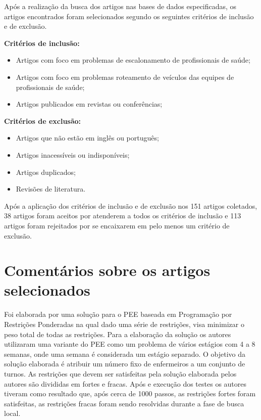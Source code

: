 Após a realização da busca dos artigos nas bases de dados especificadas, os artigos encontrados foram selecionados segundo os seguintes critérios de inclusão e de exclusão.

\textbf{Critérios de inclusão:}
\begin{itemize}
\item Artigos com foco em problemas de escalonamento de profissionais de saúde;
\item Artigos com foco em problemas roteamento de veículos das equipes de profissionais de saúde;
\item Artigos publicados em revistas ou conferências;

\end{itemize}

\textbf{Critérios de exclusão:}
\begin{itemize}
\item Artigos que não estão em inglês ou português;
\item Artigos inacessíveis ou indisponíveis;
\item Artigos duplicados;
\item Revisões de literatura.
\end{itemize}

Após a aplicação dos critérios de inclusão e de exclusão nos 151 artigos coletados, 38 artigos foram aceitos por atenderem a todos os critérios de inclusão e 113 artigos foram rejeitados por se encaixarem em pelo menos um critério de exclusão. %


\section{Comentários sobre os artigos selecionados}

Foi elaborada por \cite{santos:2015} uma solução para o \ac{PEE} baseada em Programação por Restrições Ponderadas na qual dado uma série de restrições, visa minimizar o peso total de todas as restrições. Para a elaboração da solução os autores utilizaram uma variante do \ac{PEE} como um problema de vários estágios com 4 a 8 semanas, onde uma semana é considerada um estágio separado. O objetivo da solução elaborada é atribuir um número fixo de enfermeiros a um conjunto de turnos. As restrições que devem ser satisfeitas pela solução elaborada pelos autores são divididas em fortes e fracas. Após e execução dos testes os autores tiveram como resultado que, após cerca de 1000 passos, as restrições fortes foram satisfeitas, as restrições fracas foram sendo resolvidas durante a fase de busca local.

